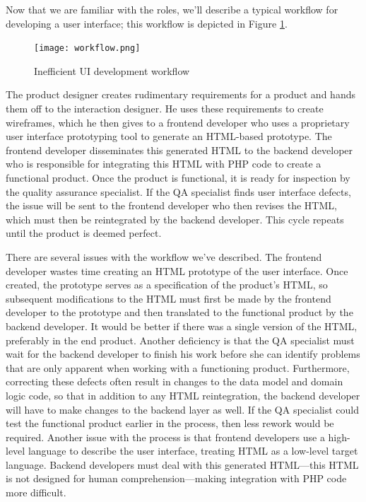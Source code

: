 \documentclass[10pt, twocolumn]{article}
\begin{document}
Now that we are familiar with the roles, we'll describe a typical
workflow for developing a user interface; this workflow is
depicted in Figure \ref{workflow}.

\begin{figure}
  \centering
  \texttt{[image: workflow.png]}
  \caption{Inefficient UI development workflow}
  \label{workflow}
\end{figure}

The product designer creates rudimentary requirements for a
product and hands them off to the interaction designer. He uses
these requirements to create wireframes, which he then gives to a
frontend developer who uses a proprietary user interface
prototyping tool to generate an HTML-based prototype. The frontend
developer disseminates this generated HTML to the backend
developer who is responsible for integrating this HTML with
PHP\cite{PHP} code to create a functional product. Once the
product is functional, it is ready for inspection by the quality
assurance specialist. If the QA specialist finds user interface
defects, the issue will be sent to the frontend developer who then
revises the HTML, which must then be reintegrated by the backend
developer. This cycle repeats until the product is deemed perfect.

There are several issues with the workflow we've described. The
frontend developer wastes time creating an HTML prototype of the
user interface. Once created, the prototype serves as a
specification of the product's HTML, so subsequent modifications
to the HTML must first be made by the frontend developer to the
prototype and then translated to the functional product by the
backend developer. It would be better if there was a single
version of the HTML, preferably in the end product. Another
deficiency is that the QA specialist must wait for the backend
developer to finish his work before she can identify problems that
are only apparent when working with a functioning product.
Furthermore, correcting these defects often result in changes to
the data model and domain logic code, so that in addition to any
HTML reintegration, the backend developer will have to make
changes to the backend layer as well. If the QA specialist could
test the functional product earlier in the process, then less
rework would be required. Another issue with the process is that
frontend developers use a high-level language to describe the user
interface, treating HTML as a low-level target language. Backend
developers must deal with this generated HTML---this HTML is not
designed for human comprehension---making integration with PHP
code more difficult.
\end{document}
